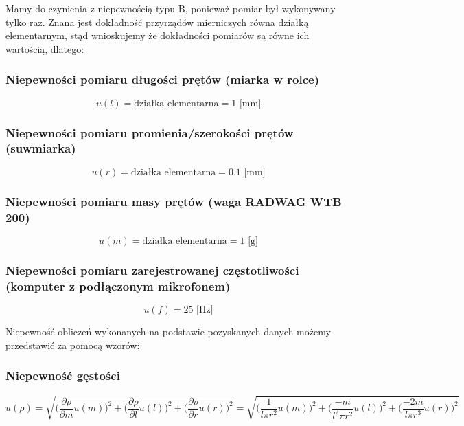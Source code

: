\documentclass[a4paper,12pts]{article}
\begin{document}
	Mamy do czynienia z niepewnością typu B, ponieważ pomiar był wykonywany tylko raz. Znana jest dokładność przyrządów mierniczych równa działką elementarnym, stąd wnioskujemy że dokładności pomiarów są równe ich wartością, dlatego:
	
	\subsubsection{Niepewności pomiaru długości prętów (miarka w rolce)}
	\begin{equation}
	u(l) = \textrm{działka elementarna} = 1 \textrm{ [mm]}
	\end{equation}
	
	\subsubsection{Niepewności pomiaru promienia/szerokości prętów (suwmiarka)}
		\begin{equation}
	u(r) = \textrm{działka elementarna} = 0.1 \textrm{ [mm]}
	\end{equation}
	
	\subsubsection{Niepewności pomiaru masy prętów (waga RADWAG WTB 200)}
	\begin{equation}
	u(m) = \textrm{działka elementarna} = 1 \textrm{ [g]}
	\end{equation}
	
	\subsubsection{Niepewności pomiaru zarejestrowanej częstotliwości (komputer z podłączonym mikrofonem)}
	\begin{equation}
	u(f) =  25 \textrm{ [Hz]}
	\end{equation}

	\begin{flushleft}
		\newpage Niepewność obliczeń wykonanych na podstawie pozyskanych danych możemy przedstawić za pomocą wzorów:
	\end{flushleft}

	\subsubsection{Niepewność gęstości}
	
	$$ u(\rho)=\sqrt{\bigg(\frac{\partial \rho}{\partial m}u(m)\bigg)^2+\bigg(\frac{\partial \rho}{\partial l}u(l)\bigg)^2+\bigg(\frac{\partial \rho}{\partial r}u(r)\bigg)^2} = \sqrt{\bigg(\frac{1}{l\pi r^2}u(m)\bigg)^2+\bigg(\frac{-m}{l^2 \pi r^2}u(l)\bigg)^2+\bigg(\frac{-2m}{l\pi r^3}u(r)\bigg)^2}$$
	
\end{document}
